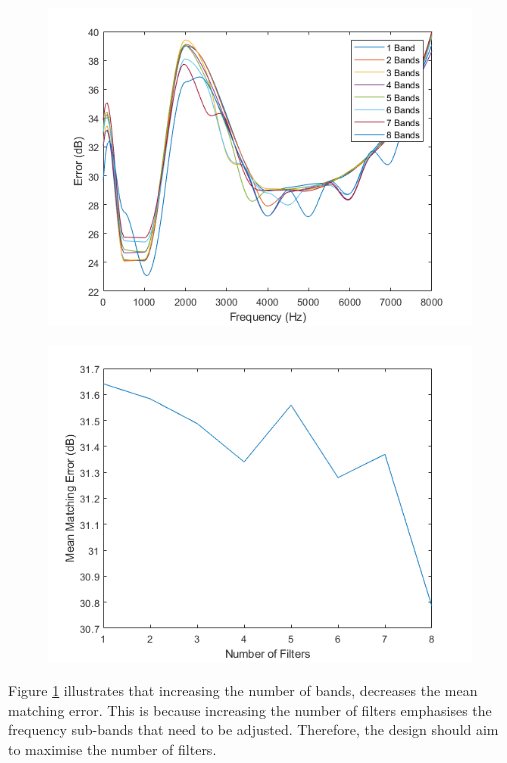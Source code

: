 \documentclass[11pt,onecolumn]{witseiepaper}
\begin{document}
\begin{figure}
\centering
\begin{minipage}{.45\linewidth}
  \centering
  \includegraphics[width=0.9\linewidth]{numBandsErrorFreq.png}
  \label{fig:numBandsErrorFreq}
\end{minipage}%
\begin{minipage}{.45\linewidth}
  \centering
  \includegraphics[width=0.9\linewidth]{numBandErrorBand.png}
  \label{fig:numBandsErrorBand}
\end{minipage}
\end{figure}

\noindent Figure \ref{fig:numBandsErrorBand} illustrates that increasing the number of bands, decreases the mean matching error. This is because increasing the number of filters emphasises the frequency sub-bands that need to be adjusted. Therefore, the design should aim to maximise the number of filters.
\end{document}
